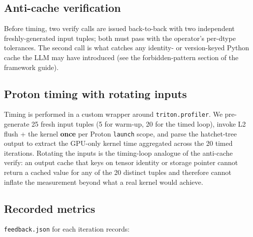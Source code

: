 \documentclass[11pt]{article}
\begin{document}
\subsection{Anti-cache verification}

Before timing, two verify calls are issued back-to-back with two
independent freshly-generated input tuples; both must pass with the
operator's per-dtype tolerances. The second call is what catches any
identity- or version-keyed Python cache the LLM may have introduced
(see the forbidden-pattern section of the framework guide).

\subsection{Proton timing with rotating inputs}

Timing is performed in a custom wrapper around
\texttt{triton.profiler}. We pre-generate 25 fresh input tuples (5 for
warm-up, 20 for the timed loop), invoke L2 flush + the kernel
\textbf{once} per Proton \texttt{launch} scope, and parse the
hatchet-tree output to extract the GPU-only kernel time aggregated
across the 20 timed iterations. Rotating the inputs is the timing-loop
analogue of the anti-cache verify: an output cache that keys on tensor
identity or storage pointer cannot return a cached value for any of
the 20 distinct tuples and therefore cannot inflate the measurement
beyond what a real kernel would achieve.

\subsection{Recorded metrics}

\texttt{feedback.json} for each iteration records:
\end{document}

